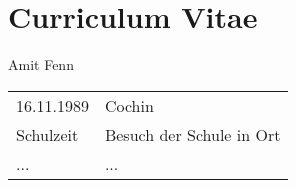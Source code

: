 \chapter*{Curriculum Vitae}

Amit Fenn

\vspace*{2.0cm}

\begin{tabular}{ll}

16.11.1989 & Cochin \\[1.5ex]
Schulzeit & Besuch der Schule in Ort \\[1.5ex]
 ... & ...
\end{tabular}
